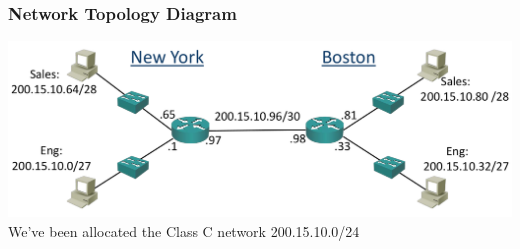 \documentclass[pdflatex,compress]{beamer}
\begin{document}
\begin{frame}
	\frametitle{Network Topology Diagram}
	\begin{center}
		\includegraphics[width=\linewidth]{img/img15}
		We've been allocated the Class C network 200.15.10.0/24
	\end{center}
\end{frame}
\end{document}
